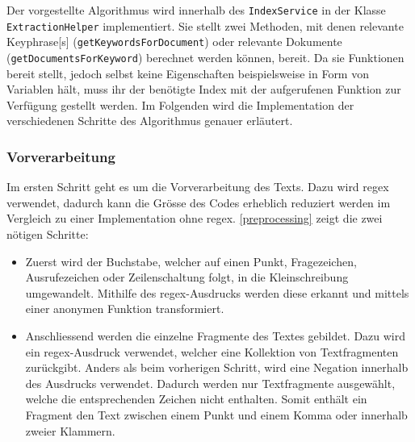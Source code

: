 

Der vorgestellte Algorithmus wird innerhalb des \texttt{IndexService} in der Klasse \texttt{ExtractionHelper} implementiert. Sie stellt zwei Methoden, mit denen relevante \gls{Keyphrase}[s] (\texttt{getKeywordsForDocument}) oder relevante Dokumente (\texttt{getDocumentsForKeyword}) berechnet werden können, bereit. Da sie Funktionen bereit stellt, jedoch selbst keine Eigenschaften beispielsweise in Form von Variablen hält, muss ihr der benötigte Index mit der aufgerufenen Funktion zur Verfügung gestellt werden. 
Im Folgenden wird die Implementation der verschiedenen Schritte des Algorithmus genauer erläutert.


\subsubsection{Vorverarbeitung}


Im ersten Schritt geht es um die Vorverarbeitung des Texts. Dazu wird \gls{regex} verwendet, dadurch kann die Grösse des Codes erheblich reduziert werden im Vergleich zu einer Implementation ohne \gls{regex}. \autoref{preprocessing} zeigt die zwei nötigen Schritte:
\begin{itemize}
    \item Zuerst wird der Buchstabe, welcher auf einen Punkt, Fragezeichen, Ausrufezeichen oder Zeilenschaltung folgt, in die Kleinschreibung umgewandelt. Mithilfe des \gls{regex}-Ausdrucks werden diese erkannt und mittels einer anonymen Funktion transformiert.
    \item Anschliessend werden die einzelne Fragmente des Textes gebildet. Dazu wird ein \gls{regex}-Ausdruck verwendet, welcher eine Kollektion von Textfragmenten zurückgibt. Anders als beim vorherigen Schritt, wird eine Negation innerhalb des Ausdrucks verwendet. Dadurch werden nur Textfragmente ausgewählt, welche die entsprechenden Zeichen nicht enthalten. Somit enthält ein Fragment den Text zwischen einem Punkt und einem Komma oder innerhalb zweier Klammern. 
\end{itemize}


